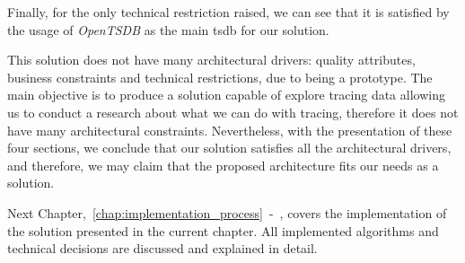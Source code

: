 


Finally, for the only technical restriction raised, we can see that it is satisfied by the usage of \emph{OpenTSDB} as the main \gls{tsdb} for our solution.

This solution does not have many architectural drivers: quality attributes, business constraints and technical restrictions, due to being a prototype. The main objective is to produce a solution capable of explore tracing data allowing us to conduct a research about what we can do with tracing, therefore it does not have many architectural constraints. Nevertheless, with the presentation of these four sections, we conclude that our solution satisfies all the architectural drivers, and therefore, we may claim that the proposed architecture fits our needs as a solution.

Next Chapter,~\ref{chap:implementation_process}~-~, covers the implementation of the solution presented in the current chapter. All implemented algorithms and technical decisions are discussed and explained in detail.

\checkoddpage
{}
{ %
    \newpage
    \blankpage}
{ %
}